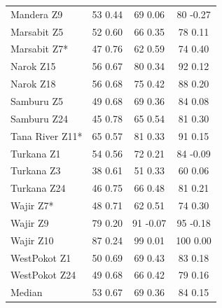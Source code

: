 \documentclass[review]{elsarticle}
\begin{document}
\begin{table}
\begin{tabular}{l|ccc}
		Mandera Z9 & 53 0.44 & 69 0.06 & 80 -0.27 \\
		Marsabit Z5 & 52 0.60 & 66 0.35 & 78 0.11 \\
		Marsabit Z7* & 47 0.76 & 62 0.59 & 74 0.40 \\
		Narok Z15 & 56 0.67 & 80 0.34 & 92 0.12 \\
		Narok Z18 & 56 0.68 & 75 0.42 & 88 0.20 \\
		Samburu Z5 & 49 0.68 & 69 0.36 & 84 0.08 \\
		Samburu Z24 & 45 0.78 & 65 0.54 & 81 0.30 \\
		Tana River Z11* & 65 0.57 & 81 0.33 & 91 0.15 \\
		Turkana Z1 & 54 0.56 & 72 0.21 & 84 -0.09 \\
		Turkana Z3 & 38 0.61 & 51 0.33 & 60 0.06 \\
		Turkana Z24 & 46 0.75 & 66 0.48 & 81 0.21 \\
		Wajir Z7* & 48 0.71 & 62 0.51 & 74 0.30 \\
		Wajir Z9 & 79 0.20 & 91 -0.07 & 95 -0.18 \\
		Wajir Z10 & 87 0.24 & 99 0.01 & 100 0.00 \\
		WestPokot Z1 & 50 0.69 & 69 0.43 & 83 0.18 \\
		WestPokot Z24 & 49 0.68 & 66 0.42 & 79 0.16 \\
		\bottomrule
		Median & 53 0.67 & 69 0.36 & 84 0.15 \\
		\bottomrule
	\end{tabular}
\end{table}
\end{document}
